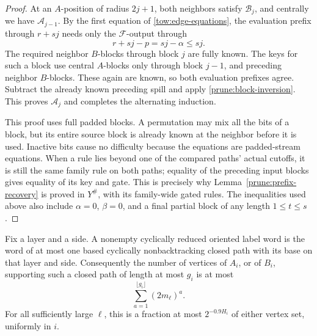 \begin{proof}
At an \(A\)-position of radius \(2j+1\), both neighbors satisfy
\(\mathcal B_j\), and centrally we have
\(\mathcal A_{j-1}\).  By the first equation of
\eqref{tow:edge-equations}, the evaluation prefix through \(r+sj\)
needs only the \(\mathcal F\)-output through
\[
 r+sj-p=sj-\alpha\leq sj.
\]
The required neighbor \(B\)-blocks through block \(j\) are fully
known.  The keys for such a block use central \(A\)-blocks only
through block \(j-1\), and preceding neighbor \(B\)-blocks.
These again are known, so both evaluation prefixes agree.  Subtract
the already known preceding spill and apply
\eqref{prune:block-inversion}.  This proves
\(\mathcal A_j\) and completes the alternating induction.

This proof uses full padded blocks.  A permutation may mix all the
bits of a block, but its entire source block is already known at the
neighbor before it is used.  Inactive bits cause no difficulty because
the equations are padded-stream equations.  When a rule lies beyond
one of the compared paths' actual cutoffs, it is still the same
family rule on both paths; equality of the preceding input blocks
gives equality of its key and gate.  This is precisely why
Lemma~\ref{prune:prefix-recovery} is proved in \(Y^\#\), with its
family-wide gated rules.  The
inequalities used above also include \(\alpha=0\), \(\beta=0\),
and a final partial block of any length \(1\leq t\leq s\).
\end{proof}

\begin{corollary}
\label{prune:cycle-count}
Fix a layer and a side.  A nonempty cyclically reduced oriented label
word is the word of at most one based cyclically nonbacktracking
closed path with its base on that layer and side.  Consequently the
number of vertices of \(A_i\), or of \(B_i\), supporting such a
closed path of length at most \(g_i\) is at most
\[
 \sum_{a=1}^{\lfloor g_i\rfloor}(2m_\ell)^a.
\]
For all sufficiently large \(\ell\), this is a fraction at most
\(2^{-0.9H_i}\) of either vertex set, uniformly in \(i\).
\end{corollary}

